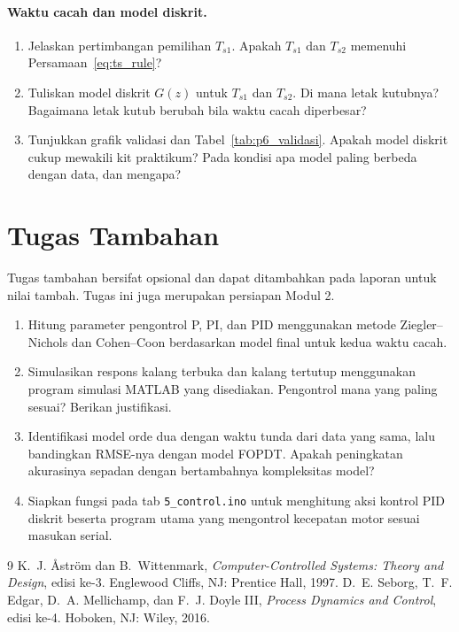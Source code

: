 \documentclass[11pt,a4paper]{article}
\newcommand{\prog}[1]{\texttt{#1}}
\begin{document}
\paragraph{Waktu cacah dan model diskrit.}
\begin{enumerate}[resume]
	\item Jelaskan pertimbangan pemilihan $T_{s1}$. Apakah $T_{s1}$ dan $T_{s2}$ memenuhi Persamaan~\eqref{eq:ts_rule}?
	\item Tuliskan model diskrit $G(z)$ untuk $T_{s1}$ dan $T_{s2}$. Di mana letak kutubnya? Bagaimana letak kutub berubah bila waktu cacah diperbesar?
	\item Tunjukkan grafik validasi dan Tabel~\ref{tab:p6_validasi}. Apakah model diskrit cukup mewakili kit praktikum? Pada kondisi apa model paling berbeda dengan data, dan mengapa?
\end{enumerate}

\section{Tugas Tambahan}
Tugas tambahan bersifat opsional dan dapat ditambahkan pada laporan untuk nilai tambah. Tugas ini juga merupakan persiapan Modul 2.
\begin{enumerate}
	\item Hitung parameter pengontrol P, PI, dan PID menggunakan metode Ziegler--Nichols dan Cohen--Coon berdasarkan model final untuk kedua waktu cacah.
	\item Simulasikan respons kalang terbuka dan kalang tertutup menggunakan program simulasi MATLAB yang disediakan. Pengontrol mana yang paling sesuai? Berikan justifikasi.
	\item Identifikasi model orde dua dengan waktu tunda dari data yang sama, lalu bandingkan RMSE-nya dengan model FOPDT. Apakah peningkatan akurasinya sepadan dengan bertambahnya kompleksitas model?
	\item Siapkan fungsi pada tab \prog{5\_control.ino} untuk menghitung aksi kontrol PID diskrit beserta program utama yang mengontrol kecepatan motor sesuai masukan serial.
\end{enumerate}

\begin{thebibliography}{9}
	 K.~J. Åström dan B.~Wittenmark, \textit{Computer-Controlled Systems: Theory and Design}, edisi ke-3. Englewood Cliffs, NJ: Prentice Hall, 1997.
	 D.~E. Seborg, T.~F. Edgar, D.~A. Mellichamp, dan F.~J. Doyle III, \textit{Process Dynamics and Control}, edisi ke-4. Hoboken, NJ: Wiley, 2016.
\end{thebibliography}
\end{document}
